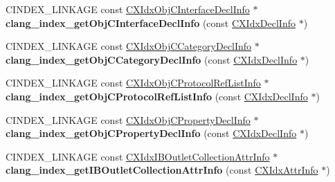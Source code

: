 \begin{DoxyCompactItemize}
\item 
\mbox{\label{group__CINDEX__HIGH_ga06efe31085488d05c291d2fb4e09edeb}} 
C\+I\+N\+D\+E\+X\+\_\+\+L\+I\+N\+K\+A\+GE const \mbox{\hyperlink{structCXIdxObjCInterfaceDeclInfo}{C\+X\+Idx\+Obj\+C\+Interface\+Decl\+Info}} $\ast$ {\bfseries clang\+\_\+index\+\_\+get\+Obj\+C\+Interface\+Decl\+Info} (const \mbox{\hyperlink{structCXIdxDeclInfo}{C\+X\+Idx\+Decl\+Info}} $\ast$)
\item 
\mbox{\label{group__CINDEX__HIGH_gac5301220677a46afd733eb1cffb2909a}} 
C\+I\+N\+D\+E\+X\+\_\+\+L\+I\+N\+K\+A\+GE const \mbox{\hyperlink{structCXIdxObjCCategoryDeclInfo}{C\+X\+Idx\+Obj\+C\+Category\+Decl\+Info}} $\ast$ {\bfseries clang\+\_\+index\+\_\+get\+Obj\+C\+Category\+Decl\+Info} (const \mbox{\hyperlink{structCXIdxDeclInfo}{C\+X\+Idx\+Decl\+Info}} $\ast$)
\item 
\mbox{\label{group__CINDEX__HIGH_ga5c39608c859456cbc78109d010765415}} 
C\+I\+N\+D\+E\+X\+\_\+\+L\+I\+N\+K\+A\+GE const \mbox{\hyperlink{structCXIdxObjCProtocolRefListInfo}{C\+X\+Idx\+Obj\+C\+Protocol\+Ref\+List\+Info}} $\ast$ {\bfseries clang\+\_\+index\+\_\+get\+Obj\+C\+Protocol\+Ref\+List\+Info} (const \mbox{\hyperlink{structCXIdxDeclInfo}{C\+X\+Idx\+Decl\+Info}} $\ast$)
\item 
\mbox{\label{group__CINDEX__HIGH_ga6319eecf732286e2d1c59582bccfad07}} 
C\+I\+N\+D\+E\+X\+\_\+\+L\+I\+N\+K\+A\+GE const \mbox{\hyperlink{structCXIdxObjCPropertyDeclInfo}{C\+X\+Idx\+Obj\+C\+Property\+Decl\+Info}} $\ast$ {\bfseries clang\+\_\+index\+\_\+get\+Obj\+C\+Property\+Decl\+Info} (const \mbox{\hyperlink{structCXIdxDeclInfo}{C\+X\+Idx\+Decl\+Info}} $\ast$)
\item 
\mbox{\label{group__CINDEX__HIGH_ga56c79b1bd72e70149706933a3112f871}} 
C\+I\+N\+D\+E\+X\+\_\+\+L\+I\+N\+K\+A\+GE const \mbox{\hyperlink{structCXIdxIBOutletCollectionAttrInfo}{C\+X\+Idx\+I\+B\+Outlet\+Collection\+Attr\+Info}} $\ast$ {\bfseries clang\+\_\+index\+\_\+get\+I\+B\+Outlet\+Collection\+Attr\+Info} (const \mbox{\hyperlink{structCXIdxAttrInfo}{C\+X\+Idx\+Attr\+Info}} $\ast$)
\item 
\mbox{\label{group__CINDEX__HIGH_gaeba620227e5d19dbe6d23b801c1753a6}} 

\end{DoxyCompactItemize}
